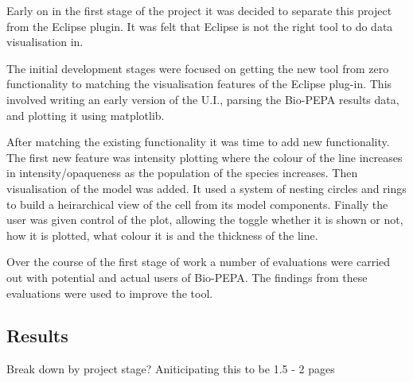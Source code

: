 Early on in the first stage of the project it was decided to separate this project from the Eclipse plugin.  It was felt that Eclipse is not the right tool to do data visualisation in.

The initial development stages were focused on getting the new tool from zero functionality to matching the visualisation features of the Eclipse plug-in.  This involved writing an early version of the U.I., parsing the Bio-PEPA results data, and plotting it using matplotlib.

After matching the existing functionality it was time to add new functionality.
The first new feature was intensity plotting where the colour of the line increases in intensity/opaqueness as the population of the species increases.  Then visualisation of the model was added.  It used a system of nesting circles and rings to build a heirarchical view of the cell from its model components.  Finally the user was given control of the plot, allowing the toggle whether it is shown or not, how it is plotted, what colour it is and the thickness of the line.

Over the course of the first stage of work a number of evaluations were carried out with potential and actual users of Bio-PEPA.  The findings from these evaluations were used to improve the tool.

\subsection{Results}

Break down by project stage?  Aniticipating this to be 1.5 - 2 pages

